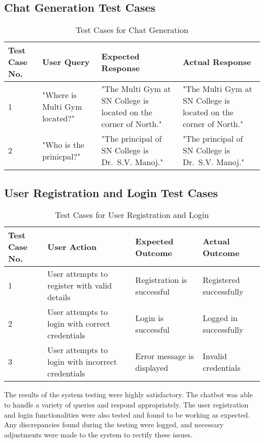 \subsection{Chat Generation Test Cases}

\begin{table}[h!]
  \centering
  \begin{tabular}{|p{1.2cm}|p{3.3cm}|p{4cm}|p{4cm}|}
  \hline
  \textbf{Test Case No.} & \textbf{User Query} & \textbf{Expected Response} & \textbf{Actual Response} \\
  \hline
  1 & "Where is Multi Gym located?" & "The Multi Gym at SN College is located on the corner of North." & "The Multi Gym at SN College is located on the corner of North." \\
  \hline
  2 & "Who is the prinicpal?" & "The principal of SN College is Dr.\ S.V. Manoj." & "The principal of SN College is Dr.\ S.V. Manoj."\\
  \hline

  \end{tabular}
  \caption{Test Cases for Chat Generation}
\end{table}

\subsection{User Registration and Login Test Cases}

\begin{table}[h]
\centering
\begin{tabular}{|p{1.2cm}|p{4cm}|p{4cm}|p{3.4cm}|}
\hline
\textbf{Test Case No.} & \textbf{User Action} & \textbf{Expected Outcome} & \textbf{Actual Outcome} \\
\hline
1 & User attempts to register with valid details & Registration is successful & Registered successfully \\
\hline
2 & User attempts to login with correct credentials & Login is successful & Logged in successfully \\
\hline
3 & User attempts to login with incorrect credentials & Error message is displayed & Invalid credentials \\
\hline
\end{tabular}
\caption{Test Cases for User Registration and Login}
\end{table}

The results of the system testing were highly satisfactory. The chatbot was able to handle a variety of queries and respond appropriately. The user registration and login functionalities were also tested and found to be working as expected. Any discrepancies found during the testing were logged, and necessary adjustments were made to the system to rectify these issues.

